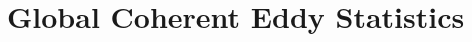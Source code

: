 \documentclass[draft,linenumbers]{agujournal2019}
\newcommand{\CEKE}{\textrm{CEKE}}
\begin{document}
	\section{Global Coherent Eddy Statistics}
	\label{sec:CE_stats}

\end{document}
